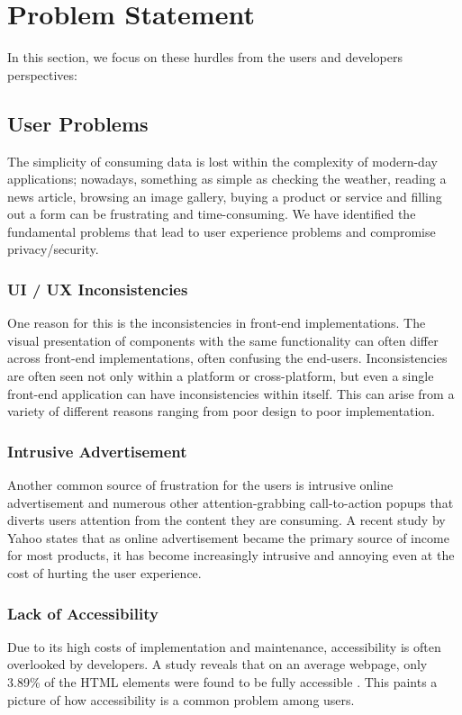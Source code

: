 
\section{Problem Statement} \label{problemStatement}

In this section, we focus on these hurdles from the users and developers perspectives:

\subsection{User Problems}

The simplicity of consuming data is lost within the complexity of modern-day applications; nowadays, something as simple as checking the weather, reading a news article, browsing an image gallery, buying a product or service and filling out a form can be frustrating and time-consuming. We have identified the fundamental problems that lead to user experience problems and compromise privacy/security.

\subsubsection{UI / UX Inconsistencies}
One reason for this is the inconsistencies in front-end implementations. The visual presentation of components with the same functionality can often differ across front-end implementations, often confusing the end-users. Inconsistencies are often seen not only within a platform or cross-platform, but even a single front-end application can have inconsistencies within itself. This can arise from a variety of different reasons ranging from poor design to poor implementation.

\subsubsection{Intrusive Advertisement}
Another common source of frustration for the users is intrusive online advertisement and numerous other attention-grabbing call-to-action popups that diverts users attention from the content they are consuming. A recent study by Yahoo \cite{IntrusiveAds} states that as online advertisement became the primary source of income for most products, it has become increasingly intrusive and annoying even at the cost of hurting the user experience.

\subsubsection{Lack of Accessibility}
Due to its high costs of implementation and maintenance, accessibility is often overlooked by developers. A study reveals that on an average webpage, only 3.89\% of the HTML elements were found to be fully accessible \cite{WebNotForAll}. This paints a picture of how accessibility is a common problem among users.

